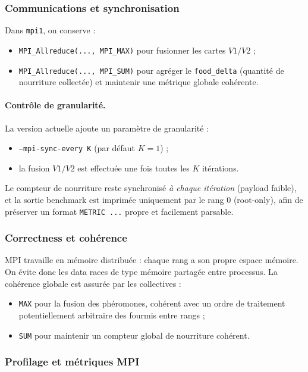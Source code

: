 \subsubsection{Communications et synchronisation}

Dans \texttt{mpi1}, on conserve :
\begin{itemize}[leftmargin=*]
  \item \texttt{MPI\_Allreduce(..., MPI\_MAX)} pour fusionner les cartes \(V1/V2\) ;
  \item \texttt{MPI\_Allreduce(..., MPI\_SUM)} pour agréger le \texttt{food\_delta} (quantité de nourriture collectée)
  et maintenir une métrique globale cohérente.
\end{itemize}

\paragraph{Contrôle de granularité.}
La version actuelle ajoute un paramètre de granularité :
\begin{itemize}[leftmargin=*]
  \item \texttt{--mpi-sync-every K} (par défaut \(K=1\)) ;
  \item la fusion \(V1/V2\) est effectuée une fois toutes les \(K\) itérations.
\end{itemize}
Le compteur de nourriture reste synchronisé \emph{à chaque itération} (payload faible),
et la sortie benchmark est imprimée uniquement par le rang 0 (root-only), afin de préserver
un format \texttt{METRIC ...} propre et facilement parsable.

\subsubsection{Correctness et cohérence}

MPI travaille en mémoire distribuée : chaque rang a son propre espace mémoire.
On évite donc les data races de type mémoire partagée entre processus.
La cohérence globale est assurée par les collectives :
\begin{itemize}[leftmargin=*]
  \item \texttt{MAX} pour la fusion des phéromones, cohérent avec un ordre de traitement
  potentiellement arbitraire des fourmis entre rangs ;
  \item \texttt{SUM} pour maintenir un compteur global de nourriture cohérent.
\end{itemize}

\subsubsection{Profilage et métriques MPI}

